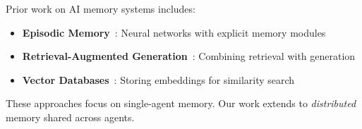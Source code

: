 Prior work on AI memory systems includes:

\begin{itemize}
    \item \textbf{Episodic Memory}~\cite{graves2016hybrid}: Neural networks with explicit memory modules
    \item \textbf{Retrieval-Augmented Generation}~\cite{lewis2020retrieval}: Combining retrieval with generation
    \item \textbf{Vector Databases}~\cite{pinecone2021}: Storing embeddings for similarity search
\end{itemize}

These approaches focus on single-agent memory. Our work extends to \emph{distributed} memory shared across agents.

